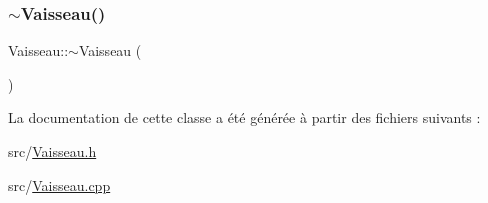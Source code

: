 \mbox{\label{class_vaisseau_ae40b8e0143d6b736065207281bde2e8a}} 
\subsubsection{\texorpdfstring{$\sim$\+Vaisseau()}{~Vaisseau()}}
{\footnotesize\ttfamily Vaisseau\+::$\sim$\+Vaisseau (\begin{DoxyParamCaption}{ }\end{DoxyParamCaption})}



La documentation de cette classe a été générée à partir des fichiers suivants \+:\begin{DoxyCompactItemize}
\item 
src/\hyperlink{_vaisseau_8h}{Vaisseau.\+h}\item 
src/\hyperlink{_vaisseau_8cpp}{Vaisseau.\+cpp}\end{DoxyCompactItemize}
